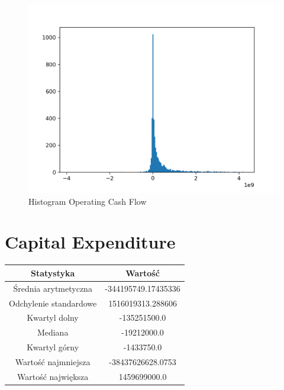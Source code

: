 \documentclass{article}
\begin{document}
\begin{figure}[h!]
    \includegraphics[width=\linewidth]{variables/Operating Cash Flow.png}
    \caption{Histogram Operating Cash Flow }
\end{figure}\section{ Capital Expenditure }

\begin{center}
    \begin{tabular}{|c | c|} 
    \hline
    Statystyka & Wartość \\
    \hline\hline
    Średnia arytmetyczna & -344195749.17435336 \\ 
    \hline
    Odchylenie standardowe & 1516019313.288606 \\
    \hline
    Kwartyl dolny & -135251500.0 \\
    \hline
    Mediana & -19212000.0 \\
    \hline
    Kwartyl górny & -1433750.0 \\
    \hline
    Wartość najmniejsza & -38437626628.0753 \\
    \hline
    Wartość największa & 1459699000.0 \\
    \hline
   \end{tabular}
\end{center}
\end{document}
